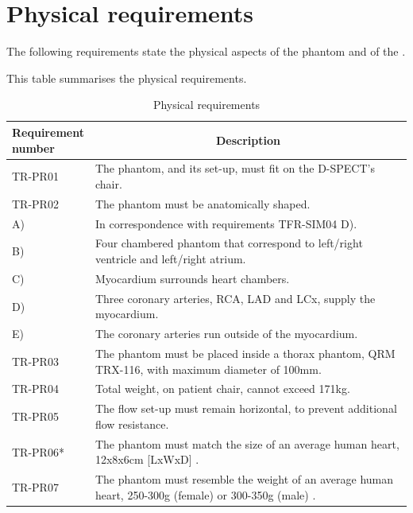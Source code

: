 \section{Physical requirements}
The following requirements state the physical aspects of the phantom and of the .
\begin{table} [H]
\caption{Physical requirements}
\label{tab:physrec}
This table summarises the physical requirements.
\begin{tabular}{l|p{120mm}|}
	\makecell[l]{\textbf{Requirement} \\ \textbf{number}} & \multicolumn{1}{c}{\textbf{Description}}\\
	\hline
	TR-PR01 & The phantom, and its set-up, must fit on the D-SPECT's chair. \\
	TR-PR02 & The phantom must be anatomically shaped. \\
	\hspace{1.5cm} A) & In correspondence with requirements TFR-SIM04 D). \\
	\hspace{1.5cm} B) & Four chambered phantom that correspond to left/right ventricle and left/right atrium. \\
	\hspace{1.5cm} C) & Myocardium surrounds heart chambers. \\
	\hspace{1.5cm} D) & Three coronary arteries, RCA, LAD and LCx, supply the myocardium. \\
	\hspace{1.5cm} E) & The coronary arteries run outside of the myocardium. \\
	TR-PR03 & The phantom must be placed inside a thorax phantom, QRM TRX-116, with maximum diameter of 100mm. \\
	TR-PR04 & Total weight, on patient chair, cannot exceed 171kg. \\
	TR-PR05 & The flow set-up must remain horizontal, to prevent additional flow resistance. \\
	TR-PR06* & The phantom must match the size of an average human heart, 12x8x6cm [LxWxD] \citep{openstax2013anatomy}. \\
	TR-PR07 & The phantom must resemble the weight of an average human heart, 250-300g (female) or 300-350g (male) \citep{openstax2013anatomy}. \\

\end{tabular}
\end{table}

